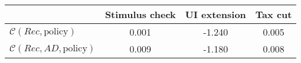 \begin{tabular}{@{}lccc@{}} 
\toprule 
                          & Stimulus check      & UI extension    & Tax cut    \\  \midrule 
$\mathcal{C}(Rec,\text{policy})$ & 0.001  & -1.240  & 0.005     \\ 
$\mathcal{C}(Rec, AD,\text{policy})$ & 0.009  & -1.180  & 0.008     \\ 
\end{tabular}  
